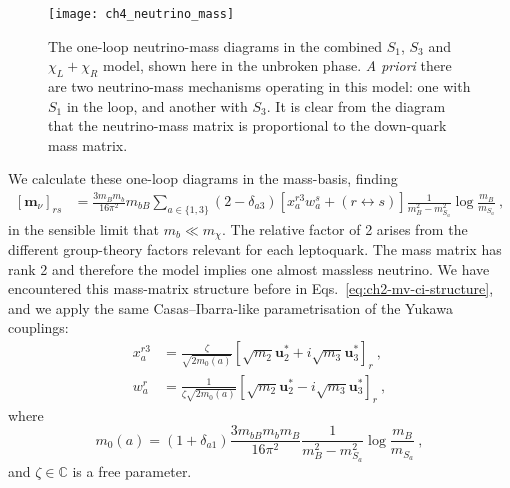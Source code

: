 \begin{figure}[t]
  \centering
  \texttt{[image: ch4\_neutrino\_mass]}
  \caption[The one-loop neutrino-mass diagrams in the combined $S_{1}$, $S_{3}$
  and $\chi_{L} + \chi_{R}$ model, shown here in the unbroken phase.]{The
    one-loop neutrino-mass diagrams in the combined $S_{1}$, $S_{3}$ and
    $\chi_{L} + \chi_{R}$ model, shown here in the unbroken phase. \textit{A
      priori} there are two neutrino-mass mechanisms operating in this model:
    one with $S_{1}$ in the loop, and another with $S_{3}$. It is clear from the
    diagram that the neutrino-mass matrix is proportional to the down-quark mass
    matrix.}
  \label{fig:ch4-one-loop-diags}
\end{figure}

We calculate these one-loop diagrams in the mass-basis, finding
\begin{equation}
  \label{eq:ch4-neutrino-mass-matrix}
  \begin{aligned}
    [\mathbf{m}_\nu]_{rs} &= \frac{3m_{B} m_b }{16\pi^2}m_{bB} \sum_{a \in \{1, 3\}}  (2 - \delta_{a3}) [x_{a}^{r3} w_{a}^s + (r \leftrightarrow s)] \frac{1}{m_{B}^2-m_{S_{a}}^2} \log \frac{m_{B}}{m_{S_{a}}} \ ,
  \end{aligned}
\end{equation}
in the sensible limit that $m_{b} \ll m_{\chi}$. The relative factor of 2 arises
from the different group-theory factors relevant for each leptoquark. The mass
matrix has rank 2 and therefore the model implies one almost massless neutrino.
We have encountered this mass-matrix structure before in
Eqs.~\eqref{eq:ch2-mv-ci-structure}, and we apply the same Casas--Ibarra-like
parametrisation of the Yukawa couplings:
\begin{equation}
  \label{eq:ch4-ci-innes}
  \begin{split}
  x_{a}^{r3} &= \frac{\zeta}{\sqrt{2 m_{0}(a)}} [\sqrt{m_{2}}\mathbf{u}_{2}^{*} + i\sqrt{m_{3}}\mathbf{u}_{3}^{*}]_{r} \ ,\\
  w_{a}^{r} &= \frac{1}{\zeta\sqrt{2 m_{0}(a)}} [\sqrt{m_{2}}\mathbf{u}_{2}^{*} - i\sqrt{m_{3}}\mathbf{u}^{*}_{3}]_{r} \ ,
  \end{split}
\end{equation}
where
\begin{equation}
  m_{0}(a) = (1 + \delta_{a1}) \frac{3 m_{bB} m_{b} m_{B}}{16\pi^{2}} \frac{1}{m_{B}^{2} - m_{S_{a}}^{2}} \log \frac{m_{B}}{m_{S_{a}}} \ ,
\end{equation}
and $\zeta \in \mathbb{C}$ is a free parameter.

